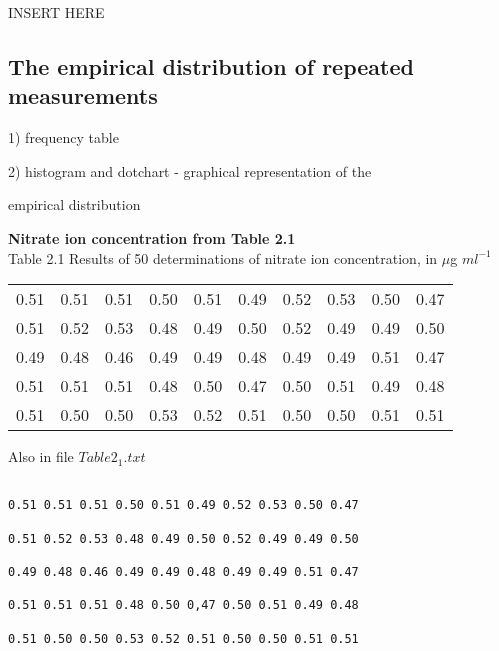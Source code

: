 

INSERT HERE

 


 



 


 

\subsection{The empirical distribution of repeated measurements}

1) frequency table

2) histogram and dotchart - graphical representation of the

empirical distribution

 



\textbf{Nitrate ion concentration from Table 2.1}\\

Table 2.1 Results of 50 determinations of nitrate ion concentration, in $\mu$g $ml^{-1}$

\begin{tabular}{|c|c|c|c|c|c|c|c|c|c|}

  \hline

0.51 &0.51 &0.51 &0.50 &0.51 &0.49 &0.52 &0.53 &0.50 &0.47\\

0.51 &0.52 &0.53 &0.48 &0.49 &0.50 &0.52 &0.49 &0.49 &0.50\\

0.49 &0.48 &0.46 &0.49 &0.49 &0.48 &0.49 &0.49 &0.51 &0.47\\

0.51 &0.51 &0.51 &0.48 &0.50 &0.47 &0.50 &0.51 &0.49 &0.48\\

0.51 &0.50 &0.50 &0.53 &0.52 &0.51 &0.50 &0.50 &0.51 &0.51\\

  \hline

\end{tabular}

 

Also in file $Table2_1.txt$

\begin{verbatim}

0.51 0.51 0.51 0.50 0.51 0.49 0.52 0.53 0.50 0.47

0.51 0.52 0.53 0.48 0.49 0.50 0.52 0.49 0.49 0.50

0.49 0.48 0.46 0.49 0.49 0.48 0.49 0.49 0.51 0.47

0.51 0.51 0.51 0.48 0.50 0,47 0.50 0.51 0.49 0.48

0.51 0.50 0.50 0.53 0.52 0.51 0.50 0.50 0.51 0.51

\end{verbatim}

